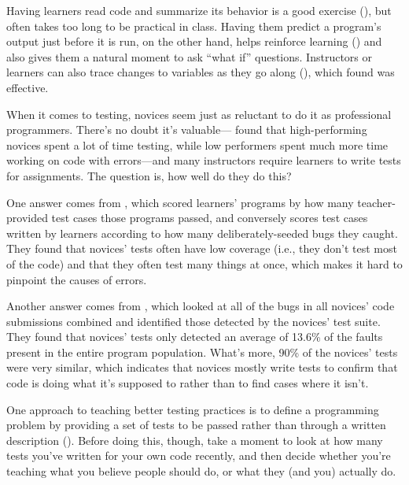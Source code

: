 Having learners read code and summarize its behavior is a good exercise
(), but often takes too long to be
practical in class. Having them predict a program's output just before
it is run, on the other hand, helps reinforce learning
() and also gives them a natural
moment to ask ``what if'' questions. Instructors or learners can also
trace changes to variables as they go along (),
which \cite{Cunn2017} found was effective.


When it comes to testing, novices seem just as reluctant to do it as
professional programmers. There's no doubt it's
valuable---\cite{Cart2017} found that high-performing novices spent a
lot of time testing, while low performers spent much more time working
on code with errors---and many instructors require learners to write tests
for assignments. The question is, how well do they do this?

One answer comes from \cite{Bria2015}, which scored learners'
programs by how many teacher-provided test cases those programs passed,
and conversely scores test cases written by learners according to how
many deliberately-seeded bugs they caught. They found that novices'
tests often have low coverage (i.e., they don't test most of the code)
and that they often test many things at once, which makes it hard to
pinpoint the causes of errors.

Another answer comes from \cite{Edwa2014b}, which looked at all of
the bugs in all novices' code submissions combined and identified those
detected by the novices' test suite. They found that novices' tests only
detected an average of 13.6\% of the faults present in the entire program
population. What's more, 90\% of the novices' tests were very similar,
which indicates that novices mostly write tests to confirm that code is
doing what it's supposed to rather than to find cases where it isn't.

One approach to teaching better testing practices is to define a
programming problem by providing a set of tests to be passed rather than
through a written description ().
Before doing this, though, take a moment to look at how many tests
you've written for your own code recently, and then decide whether
you're teaching what you believe people should do, or what they (and
you) actually do.

